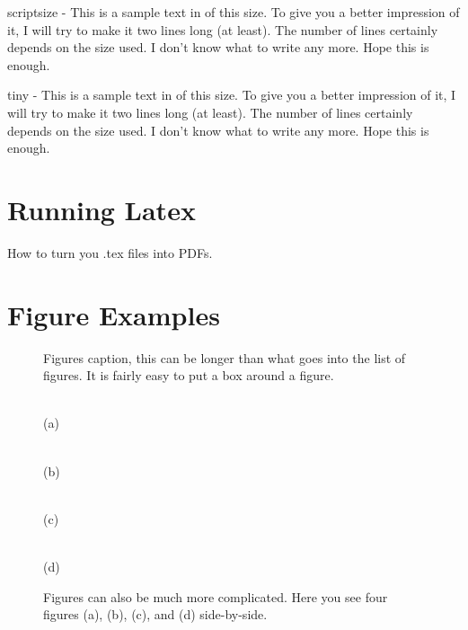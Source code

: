 \begin{scriptsize}scriptsize - This is a sample text in of this size. To give you a better impression of it, I will try to make it two lines long (at least). The number of lines certainly depends on the size used. I don't know what to write any more. Hope this is enough.\end{scriptsize}

\begin{tiny}tiny  - This is a sample text in of this size. To give you a better impression of it, I will try to make it two lines long (at least). 
The number of lines certainly depends on the size used. I don't know what to write any more. Hope this is enough.\end{tiny}

\section{Running Latex}

How to turn you .tex files into PDFs.

\section{Figure Examples}

\begin{figure}
\centering{}
\caption[Text for the list of figures]{Figures caption, this can be longer than what goes into the list of figures. It is fairly easy to put a box around a figure.}
\label{fig:example.xmas}
\end{figure}

\begin{figure}
\begin{minipage}[b]{3.2cm}
\centering{}\\
(a)
\end{minipage}
\begin{minipage}[b]{2.9cm}
\centering{}\\
(b)
\end{minipage}
\begin{minipage}[b]{3.2cm}
\centering{}\\
(c)
\end{minipage}
\begin{minipage}[b]{2.9cm}
\centering{}\\
(d)
\end{minipage}
\caption[Complicated Figure]{Figures can also be much more complicated. Here you see four figures (a), (b), (c), and (d) side-by-side.}
\label{fig:complicated}
\end{figure}


